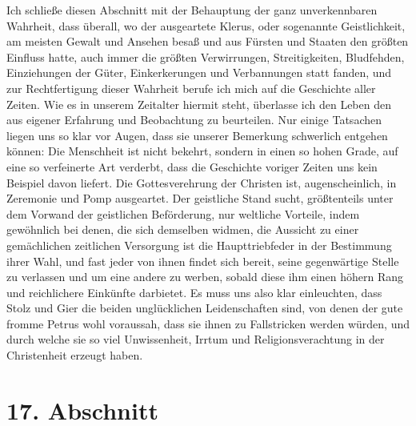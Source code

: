Ich schließe diesen Abschnitt mit der Behauptung der ganz unverkennbaren
Wahrheit, dass überall, wo der ausgeartete
Klerus, oder sogenannte
Geistlichkeit, am meisten
Gewalt und Ansehen besaß und aus Fürsten und
Staaten den größten Einfluss hatte, auch immer die größten Verwirrungen,
Streitigkeiten, Bludfehden, Einziehungen der Güter, Einkerkerungen und
Verbannungen statt fanden, und zur Rechtfertigung dieser
Wahrheit berufe ich
mich auf die Geschichte aller Zeiten. Wie es in unserem Zeitalter hiermit steht,
überlasse ich den Leben den aus eigener Erfahrung und Beobachtung zu
beurteilen. Nur einige Tatsachen liegen uns so klar vor Augen, dass sie unserer
Bemerkung schwerlich entgehen können: Die Menschheit ist nicht
bekehrt, sondern
in einen so hohen Grade, auf eine so verfeinerte Art verderbt, dass die
Geschichte voriger Zeiten uns kein Beispiel davon liefert. Die Gottesverehrung
der Christen ist, augenscheinlich, in Zeremonie und Pomp ausgeartet. Der
geistliche Stand sucht, größtenteils unter dem Vorwand der geistlichen
Beförderung, nur weltliche Vorteile, indem gewöhnlich bei denen, die sich
demselben widmen, die Aussicht zu einer gemächlichen zeitlichen Versorgung ist
die
Haupttriebfeder in der Bestimmung ihrer Wahl, und fast jeder von ihnen findet
sich
bereit, seine gegenwärtige Stelle zu verlassen und um eine andere zu
werben, sobald diese ihm einen höhern Rang und reichlichere Einkünfte darbietet.
Es muss uns also klar einleuchten, dass Stolz und Gier die beiden unglücklichen
Leidenschaften sind, von denen der gute fromme Petrus
wohl voraussah, dass sie
ihnen zu Fallstricken werden würden, und durch welche sie so viel Unwissenheit,
Irrtum und Religionsverachtung in der Christenheit erzeugt haben.

\section{17. Abschnitt} \label{kap7_ab17}

